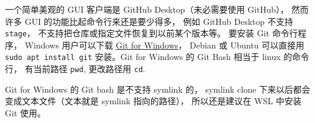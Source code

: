 

一个简单美观的 GUI 客户端是 GitHub Desktop（未必需要使用 GitHub）， 然而许多 GUI 的功能比起命令行来还是要少得多， 例如 GitHub Desktop 不支持 \verb|stage|， 不支持把仓库或指定文件恢复到以前某个版本等。 要安装 Git 命令行程序， Windows 用户可以下载 \href{https://gitforwindows.org/}{Git for Windows}， Debian 或 Ubuntu 可以直接用 \verb|sudo apt install git| 安装。Git for Windows 的 Git Bash 相当于 linux 的命令行， 有当前路径 \verb|pwd|, 更改路径用 \verb|cd|.

Git for Windows 的 Git bash 是不支持 symlink 的， symlink clone 下来以后都会变成文本文件（文本就是 symlink 指向的路径）， 所以还是建议在 WSL 中安装 Git 使用。

